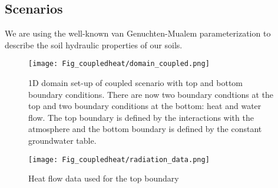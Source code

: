 \newpage
\subsection{Scenarios}

We are using the well-known van Genuchten-Mualem parameterization to describe the soil hydraulic properties of our soils. 

\begin{table}[!h]
\centering
\caption{\label{tab_heat}Material properties needed for scenarios.}
\end{table}


\begin{figure}[!h]
\centering
\texttt{[image: Fig\_coupledheat/domain\_coupled.png]}
\caption{1D domain set-up of coupled scenario with top and bottom boundary conditions. There are now two boundary condtions at the top and two boundary conditions at the bottom: heat and water flow. The top boundary is defined by the interactions with the atmosphere and the bottom boundary is defined by the constant groundwater table.}
\end{figure}


\begin{figure}[!h]
\centering
\texttt{[image: Fig\_coupledheat/radiation\_data.png]}
\caption{Heat flow data used for the top boundary}
\end{figure}

